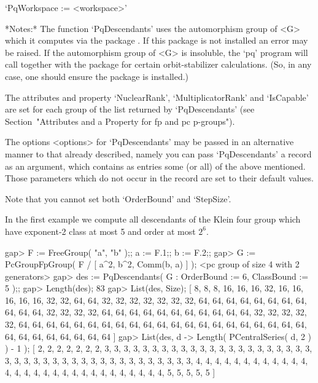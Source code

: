 \item{}`PqWorkspace := <workspace>'

\endlist

*Notes:*
The function `PqDescendants' uses the  automorphism group of <G> which it
computes via the package {\AutPGrp}.  If this package is not installed an
error may be  raised. If the automorphism group of  <G> is insoluble, the
`pq' program  will call {\GAP}  together with the {\AutPGrp}  package for
certain  orbit-stabilizer calculations.   (So,  in any  case, one  should
ensure the {\AutPGrp} package is installed.)

The  attributes  and  property  `NuclearRank',  `MultiplicatorRank'   and
`IsCapable'  are  set  for  each  group   of   the   list   returned   by
`PqDescendants' (see Section~"Attributes and a Property  for  fp  and  pc
p-groups").

The options <options> for `PqDescendants' may be passed in an alternative
manner to that already described, namely you can pass  `PqDescendants'  a
record as an argument, which contains as entries some  (or  all)  of  the
above mentioned. Those parameters which do not occur in  the  record  are
set to their default values.

Note that you cannot set both `OrderBound' and `StepSize'.

In the first example  we  compute all descendants of the Klein four group
which have exponent-2 class at most 5 and order at most $2^6$.

\beginexample
gap> F := FreeGroup( "a", "b" );; a := F.1;; b := F.2;;         
gap> G := PcGroupFpGroup( F / [ a^2, b^2, Comm(b, a) ] );
<pc group of size 4 with 2 generators>
gap> des := PqDescendants( G : OrderBound := 6, ClassBound := 5 );;
gap> Length(des);
83
gap> List(des, Size); 
[ 8, 8, 8, 16, 16, 16, 32, 16, 16, 16, 16, 16, 32, 32, 64, 64, 32, 32, 32, 
  32, 32, 32, 32, 64, 64, 64, 64, 64, 64, 64, 64, 64, 64, 64, 32, 32, 32, 32, 
  64, 64, 64, 64, 64, 64, 64, 64, 64, 64, 64, 32, 32, 32, 32, 32, 64, 64, 64, 
  64, 64, 64, 64, 64, 64, 64, 64, 64, 64, 64, 64, 64, 64, 64, 64, 64, 64, 64, 
  64, 64, 64, 64, 64, 64, 64 ]
gap> List(des, d -> Length( PCentralSeries( d, 2 ) ) - 1 );
[ 2, 2, 2, 2, 2, 2, 2, 3, 3, 3, 3, 3, 3, 3, 3, 3, 3, 3, 3, 3, 3, 3, 3, 3, 3, 
  3, 3, 3, 3, 3, 3, 3, 3, 3, 3, 3, 3, 3, 3, 3, 3, 3, 3, 3, 3, 3, 3, 3, 3, 4, 
  4, 4, 4, 4, 4, 4, 4, 4, 4, 4, 4, 4, 4, 4, 4, 4, 4, 4, 4, 4, 4, 4, 4, 4, 4, 
  4, 4, 4, 5, 5, 5, 5, 5 ]
\endexample

